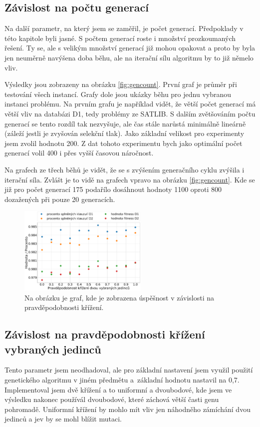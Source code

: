 \documentclass[11pt]{article}
\begin{document}
\subsection{Závislost na počtu generací}
Na další parametr, na který jsem se zaměřil, je počet generací. Předpoklady v této kapitole byli jasné. S počtem generací roste i množství prozkoumaných řešení. Ty se, ale s velikým množství generací již mohou opakovat a proto by byla jen neuměrně navýšena doba běhu, ale na iterační sílu algoritmu by to již němelo vliv. 

Výsledky jsou zobrazeny na obrázku \ref{fig:gencount}. První graf je průměr při testování všech instancí. Grafy dole jsou ukázky běhu pro jednu vybranou instanci problému. Na prvním grafu je například vidět, že větší počet generací má větší vliv  na databázi D1, tedy problémy ze SATLIB. S dalším zvětšováním počtu generací se tento rozdíl tak nezvyšuje, ale čas stále narůstá minimálně lineárně (záleží jestli je zvyšován selekční tlak). Jako základní velikost pro experimenty jsem zvolil hodnotu 200. Z dat tohoto experimentu bych jako optimální počet generací volil 400 i přes vyšší časovou náročnost. 

Na grafech ze třech běhů je vidět, že se s zvýšením generačního cyklu zvýšila i iterační síla. Zvlášt je to vidě na grafech vpravo na obrázku \ref{fig:gencount}. Kde se již pro počet generací 175 podařílo dosáhnout hodnoty 1100 oproti 800 dozažených při pouze 20 generacích. 

\begin{figure}
\begin{center}
\includegraphics[width=0.55\textwidth]{img/sat_cross.pdf} 
\caption{Na obrázku je graf, kde je zobrazena úspěšnost v závislosti na pravděpodobnosti křížení.}
\label{fig:cross}
\end{center}
\end{figure}

\subsection{Závislost na pravděpodobnosti křížení vybraných jedinců}
Tento parametr jsem neodhadoval, ale pro základní nastavení jsem využil použití genetického algoritmu v jiném předmětu a~základní hodnotu nastavil na 0,7. Implementoval jsem dvě křížení a to uniformní a dvoubodové, kde jsem ve výsledku nakonec používál dvoubodové, které záchová větší časti genu pohromadě. Uniformní křížení by mohlo mít vliv jen náhodněho zámíchání dvou jedinců a jev by se mohl blížit mutaci. 
\end{document}
